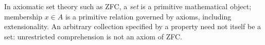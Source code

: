 
In axiomatic set theory such as ZFC, a \emph{set} is a primitive mathematical object; membership $x\in A$ is a primitive relation governed by axioms, including extensionality. An arbitrary collection specified by a property need not itself be a set: unrestricted comprehension is not an axiom of ZFC.
